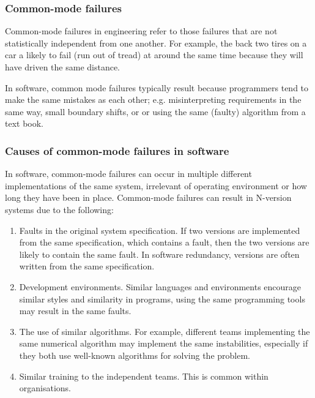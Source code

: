 \subsubsection*{Common-mode failures}

Common-mode failures in engineering refer to those failures that are not statistically independent from one another. For example, the back two tires on a car a likely to fail (run out of tread) at around the same time because they will have driven the same distance.

In software, common mode failures typically result because programmers tend to make the same mistakes as each other; e.g. misinterpreting requirements in the same way, small boundary shifts, or or using the same (faulty) algorithm from a text book.

\subsubsection*{Causes of common-mode failures in software}

In software, common-mode failures can occur in multiple different implementations of the same system, irrelevant of operating environment or how long they have been in place. Common-mode failures can result in N-version systems due to  the following:

\begin{enumerate}

\item Faults in the original system specification. If two versions are implemented from the same specification, which contains a fault, then the two versions are likely to contain the same fault. In software redundancy, versions are often written from the same specification.

\item Development environments. Similar languages and environments encourage similar styles and similarity in programs, using the same programming tools may result in the same faults.

\item The use of similar algorithms. For example, different teams implementing the same numerical algorithm may implement the same instabilities, especially if they both use well-known algorithms for solving the problem.

\item Similar training to the independent teams. This is common within organisations.

\end{enumerate}


